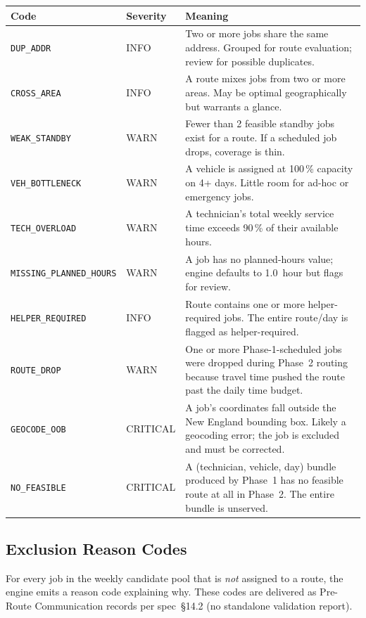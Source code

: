 \documentclass[12pt]{article}
\begin{document}
\medskip
{\small
\begin{longtable}{llp{7.5cm}}
\toprule
\textbf{Code} & \textbf{Severity} & \textbf{Meaning} \\
\midrule
\texttt{DUP\_ADDR}    & INFO     & Two or more jobs share the same address. Grouped for route evaluation; review for possible duplicates. \\
\texttt{CROSS\_AREA}  & INFO     & A route mixes jobs from two or more areas. May be optimal geographically but warrants a glance. \\
\texttt{WEAK\_STANDBY} & WARN    & Fewer than 2 feasible standby jobs exist for a route. If a scheduled job drops, coverage is thin. \\
\texttt{VEH\_BOTTLENECK} & WARN  & A vehicle is assigned at 100\,\% capacity on 4+ days. Little room for ad-hoc or emergency jobs. \\
\texttt{TECH\_OVERLOAD} & WARN   & A technician's total weekly service time exceeds 90\,\% of their available hours. \\
\texttt{MISSING\_PLANNED\_HOURS} & WARN & A job has no planned-hours value; engine defaults to 1.0~hour but flags for review. \\
\texttt{HELPER\_REQUIRED} & INFO   & Route contains one or more helper-required jobs.  The entire route/day is flagged as helper-required. \\
\texttt{ROUTE\_DROP}  & WARN     & One or more Phase-1-scheduled jobs were dropped during Phase~2 routing because travel time pushed the route past the daily time budget. \\
\texttt{GEOCODE\_OOB} & CRITICAL & A job's coordinates fall outside the New England bounding box. Likely a geocoding error; the job is excluded and must be corrected. \\
\texttt{NO\_FEASIBLE} & CRITICAL & A (technician, vehicle, day) bundle produced by Phase~1 has no feasible route at all in Phase~2. The entire bundle is unserved. \\
\bottomrule
\end{longtable}
}

\subsection*{Exclusion Reason Codes}

For every job in the weekly candidate pool that is \emph{not} assigned to a route, the engine emits a reason code explaining why.
These codes are delivered as Pre-Route Communication records per spec~\S14.2 (no standalone validation report).
\end{document}
